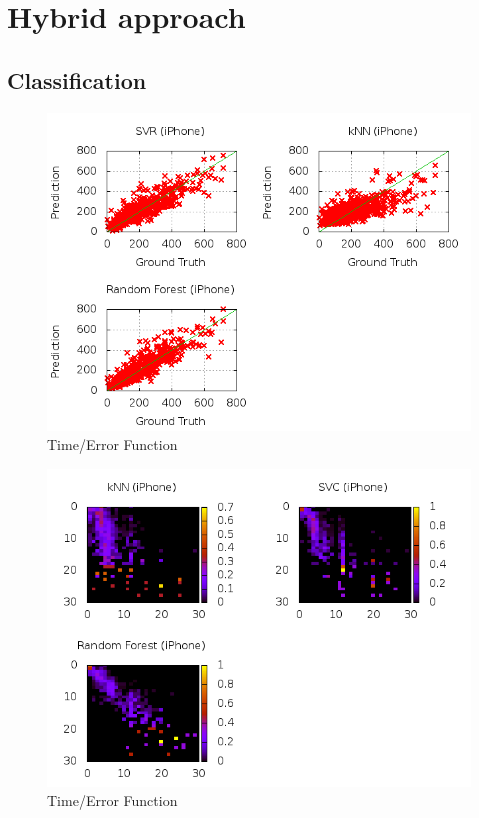  

\section{Hybrid approach}
\subsection{Classification}
\begin{figure}
\centering
\includegraphics[scale=0.55]{images/plots/machine_learning/iphone/true_pred_iphone.png}
\caption{Time/Error Function}
\label{crowdsourcing_desc_length}
\end{figure}
\begin{figure}
\centering
\includegraphics[scale=0.55]{images/plots/machine_learning/iphone/conf_mat_iphone.png}
\caption{Time/Error Function}
\label{crowdsourcing_desc_length}
\end{figure}

